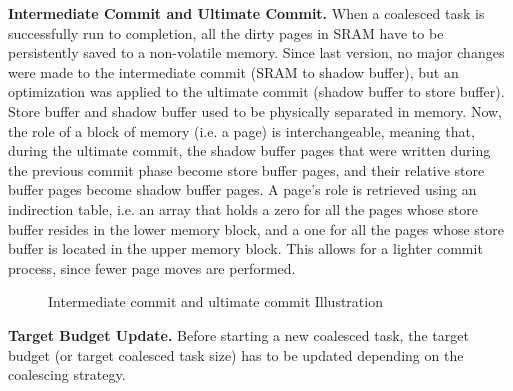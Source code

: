 \noindent \textbf{Intermediate Commit and Ultimate Commit.} When a coalesced task is successfully run to completion, all the dirty pages in SRAM have to be persistently saved to a non-volatile memory. Since last version, no major changes were made to the intermediate commit (SRAM to shadow buffer), but an optimization was applied to the ultimate commit (shadow buffer to store buffer). Store buffer and shadow buffer used to be physically separated in memory. Now, the role of a block of memory (i.e. a page) is interchangeable, meaning that, during the ultimate commit, the shadow buffer pages that were written during the previous commit phase become store buffer pages, and their relative store buffer pages become shadow buffer pages. A page’s role is retrieved using an indirection table, i.e. an array that holds a zero for all the pages whose store buffer resides in the lower memory block, and a one for all the pages whose store buffer is located in the upper memory block. This allows for a lighter commit process, since fewer page moves are performed.

\begin{figure}
	\centering
	\caption{Intermediate commit and ultimate commit Illustration }
	\label{fig:intermediate_ultimate-commit}
\end{figure}

\noindent \textbf{Target Budget Update.} Before starting a new coalesced task, the target budget (or target coalesced task size) has to be updated depending on the coalescing strategy. 

